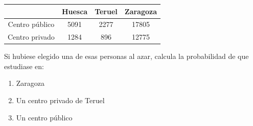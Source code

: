 \documentclass[fleqn]{article}
\begin{document}
\begin{enumerate}
\begin{tabular}{|c|c|c|c|}
\hline 
 & Huesca & Teruel & Zaragoza \\ 
\hline 
Centro público & 5091 & 2277 & 17805 \\ 
\hline 
Centro privado & 1284 & 896 & 12775 \\ 
\hline 
\end{tabular} 

Si hubiese elegido una de esas personas al azar, calcula la probabilidad de que estudiase en:
\begin{enumerate}
\item Zaragoza \noanswer
\item Un centro privado de Teruel \noanswer
\item Un centro público \noanswer
\end{enumerate}
 \end{enumerate}
\end{document}
